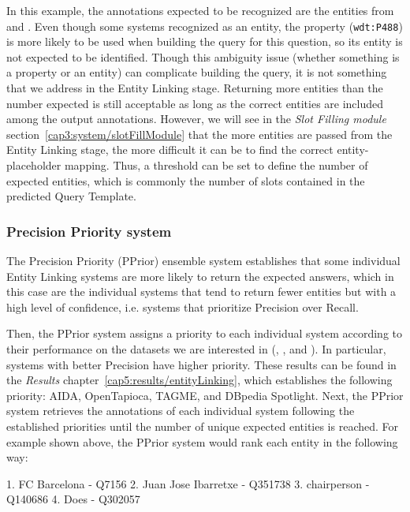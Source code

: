 In this example, the annotations expected to be recognized are the entities from  and . Even though some systems recognized 
 as an entity, the property  (\texttt{wdt:P488}) 
is more likely to be used when building the \SPARQL{} query for this question, so its entity is 
not expected to be identified. Though this ambiguity issue (whether something is a property or 
an entity) can complicate building the \SPARQL{} query, it is not something that we address in 
the Entity Linking stage. Returning more entities than the number expected is still acceptable 
as long as the correct entities are included among the output annotations. However, we will 
see in the \textit{Slot Filling module} section~\ref{cap3:system/slotFillModule} that the more 
entities are passed from the Entity Linking stage, the more difficult it can be to find the 
correct entity-placeholder mapping. Thus, a threshold can be set to define the number of 
expected entities, which is commonly the number of slots contained in the predicted Query 
Template.

\subsubsection{Precision Priority system}
\label{cap3:system/entLinModule/ensembleSystems/pprior}
The Precision Priority (PPrior) ensemble system establishes that some individual Entity 
Linking systems are more likely to return the expected answers, which in this case are the 
individual systems that tend to return fewer entities but with a high level of confidence, 
i.e. systems that prioritize Precision over Recall.

Then, the PPrior system assigns a priority to each individual system according to their 
performance on the datasets we are interested in (\LCQuADtwo, \DBNQA, and \QALDseven). In 
particular, systems with better Precision have higher priority. These results can be found in 
the \textit{Results} chapter~\ref{cap5:results/entityLinking}, 
which establishes the following priority: AIDA, OpenTapioca, TAGME, and DBpedia Spotlight. Next, 
the PPrior system retrieves the annotations of each individual system following the established 
priorities until the number of unique expected entities is reached. 
For example shown above, the PPrior system would rank each entity in the following way:

\begin{sparqlcode}[]
1. FC Barcelona - Q7156
2. Juan Jose Ibarretxe - Q351738
3. chairperson - Q140686
4. Does - Q302057     
\end{sparqlcode}

